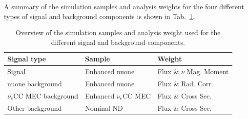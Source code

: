 A summary of the simulation samples and analysis weights for the four different types of signal and background components is shown in Tab.~\ref{tab:NuMMSamplesAndWeightsOverview}.

\begin{table}[!ht]
\centering
\caption{Overview of the simulation samples and analysis weight used for the different signal and background components.}
\def\arraystretch{1.4}
\begin{tabular}{l@{\hskip 1cm}l@{\hskip 1cm}l}
Signal type            & Sample               & Weight\\\hline
Signal                 & Enhanced \gls{nuone} & Flux \& $\nu$ Mag. Moment\\
\gls{nuone} background & Enhanced \gls{nuone} & Flux \& Rad. Corr.\\
$\nu_e$\gls{CC} \gls{MEC} background & Enhanced $\nu_e$\gls{CC} \gls{MEC} & Flux \& Cross Sec.\\
Other background       & Nominal \gls{ND}     & Flux \& Cross Sec.
\end{tabular}
\label{tab:NuMMSamplesAndWeightsOverview}
\end{table}

